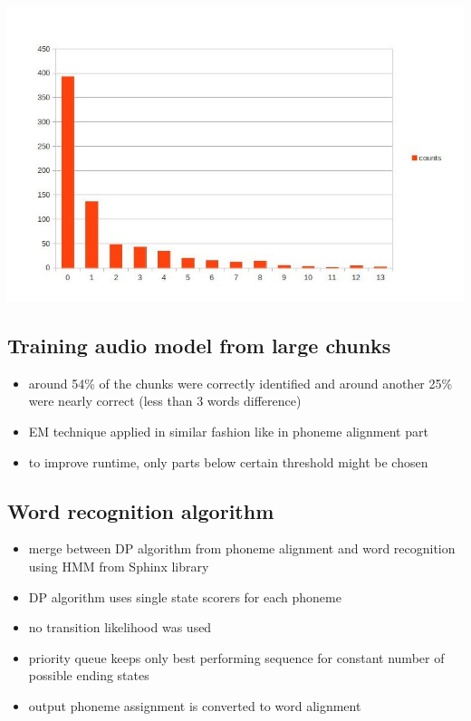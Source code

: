 \documentclass[]{beamer}
\begin{document}
\begin{frame}
    \includegraphics[scale=0.37]{length_based_results_better.jpg}
\end{frame}
\subsection{Training audio model from large chunks}
\begin{frame}
    \begin{itemize}
        \item around 54\% of the chunks were correctly identified and around another 25\% were nearly correct (less than 3 words difference)
        \item EM technique applied in similar fashion like in phoneme alignment part
        \item to improve runtime, only parts below certain threshold might be chosen
    \end{itemize}
    
\end{frame}
\subsection{Word recognition algorithm}
\begin{frame}
    \begin{itemize}
        \item merge between DP algorithm from phoneme alignment and word recognition using HMM from Sphinx library
        \item DP algorithm uses single state scorers for each phoneme
        \item no transition likelihood was used
        \item priority queue keeps only best performing sequence for constant number of possible ending states
        \item output phoneme assignment is converted to word alignment
    \end{itemize}
\end{frame}
\end{document}
